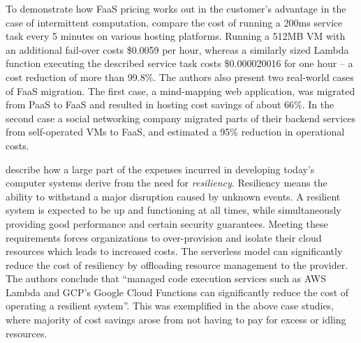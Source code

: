 To demonstrate how FaaS pricing works out in the customer's advantage in the case of intermittent computation, \textcite{adzic2017serverless} compare the cost of running a 200ms service task every 5 minutes on various hosting platforms. Running a 512MB VM with an additional fail-over costs \$0.0059 per hour, whereas a similarly sized Lambda function executing the described service task costs \$0.000020016 for one hour -- a cost reduction of more than 99.8\%. The authors also present two real-world cases of FaaS migration. The first case, a mind-mapping web application, was migrated from PaaS to FaaS and resulted in hosting cost savings of about 66\%. In the second case a social networking company migrated parts of their backend services from self-operated VMs to FaaS, and estimated a 95\% reduction in operational costs.

\textcite{wagner16resilient} describe how a large part of the expenses incurred in developing today's computer systems derive from the need for \textit{resiliency}. Resiliency means the ability to withstand a major disruption caused by unknown events. A resilient system is expected to be up and functioning at all times, while simultaneously providing good performance and certain security guarantees. Meeting these requirements forces organizations to over-provision and isolate their cloud resources which leads to increased costs. The serverless model can significantly reduce the cost of resiliency by offloading resource management to the provider. The authors conclude that ``managed code execution services such as AWS Lambda and GCP’s Google Cloud Functions can significantly reduce the cost of operating a resilient system''. This was exemplified in the above case studies, where majority of cost savings arose from not having to pay for excess or idling resources.

